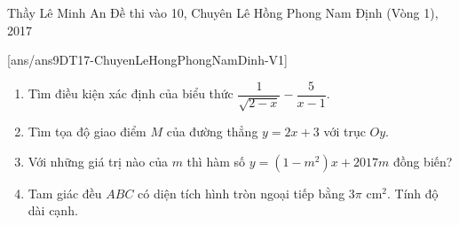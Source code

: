 \begin{name}
{Thầy  Lê Minh An}
{Đề thi vào 10, Chuyên Lê Hồng Phong Nam Định (Vòng 1), 2017}
\end{name}
\setcounter{ex}{0}
[ans/ans9DT17-ChuyenLeHongPhongNamDinh-V1]
\begin{ex}%
\hfill
\begin{enumerate}
\item Tìm điều kiện xác định của biểu thức $\dfrac{1}{\sqrt{2-x}}-\dfrac{5}{x-1}$.
\item Tìm tọa độ giao điểm $M$ của đường thẳng $y=2x+3$ với trục $Oy$.
\item Với những giá trị nào của $m$ thì hàm số $y=(1-m^2)x+2017m$ đồng biến?
\item Tam giác đều $ABC$ có diện tích hình tròn ngoại tiếp bằng $3\pi$ cm$^2$. Tính độ dài cạnh.
\end{enumerate}
\end{ex}

